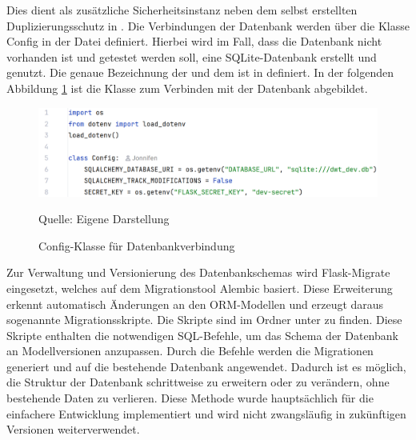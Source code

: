 Dies dient als zusätzliche Sicherheitsinstanz neben dem selbst erstellten Duplizierungsschutz in .
Die Verbindungen der Datenbank werden über die Klasse Config in der Datei  definiert.
Hierbei wird im Fall, dass die Datenbank nicht vorhanden ist und getestet werden soll, eine SQLite-Datenbank erstellt und genutzt.
Die genaue Bezeichnung der  und dem  ist in  definiert.
In der folgenden Abbildung \ref{fig:Config-Klasse für Datenbankverbindung} ist die Klasse  zum Verbinden mit der Datenbank abgebildet.

\begin{figure}[H]
    \centering
    \includegraphics[width=1\textwidth]{Grafiken/Config.png}
    \caption{Config-Klasse für Datenbankverbindung}
    \label{fig:Config-Klasse für Datenbankverbindung}
    {Quelle: Eigene Darstellung}
\end{figure}

Zur Verwaltung und Versionierung des Datenbankschemas wird Flask-Migrate eingesetzt, welches auf dem Migrationstool Alembic basiert.
Diese Erweiterung erkennt automatisch Änderungen an den ORM-Modellen und erzeugt daraus sogenannte Migrationsskripte. Die Skripte sind im Ordner  unter  zu finden.
Diese Skripte enthalten die notwendigen SQL-Befehle, um das Schema der Datenbank an Modellversionen anzupassen.
Durch die Befehle werden die Migrationen generiert und auf die bestehende Datenbank angewendet.
Dadurch ist es möglich, die Struktur der Datenbank schrittweise zu erweitern oder zu verändern, ohne bestehende Daten zu verlieren.
Diese Methode wurde hauptsächlich für die einfachere Entwicklung implementiert und wird nicht zwangsläufig in zukünftigen Versionen weiterverwendet.






